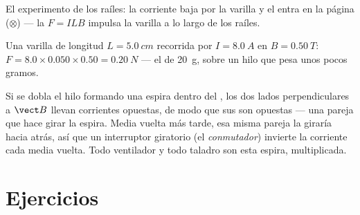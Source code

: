 \begin{omfigure}

{\small El experimento de los raíles: la corriente baja por la varilla y
el  entra en la página ($\otimes$) --- la 
$F = ILB$ impulsa la varilla a lo largo de los raíles.}
\end{omfigure}

\begin{example}\label{ex:g11:magnetic-fields:laplace}
Una varilla de longitud $L = \qty{5.0}{cm}$ recorrida por
$I = \qty{8.0}{A}$ en $B = \qty{0.50}{T}$:
$F = 8.0 \times 0.050 \times 0.50 = \qty{0.20}{N}$ --- el  de
\qty{20}{g}, sobre un hilo que pesa unos pocos gramos.
\end{example}

\begin{remark}\label{rem:g11:magnetic-fields:motor}
Si se dobla el hilo formando una espira dentro del , los dos lados
perpendiculares a $\vect B$ llevan corrientes opuestas, de modo que sus
 son opuestas --- una pareja que hace girar la espira.
Media vuelta más tarde, esa misma pareja la giraría hacia atrás, así que
un interruptor giratorio (el \emph{conmutador})
invierte la corriente cada media vuelta. Todo ventilador y todo
taladro son esta espira, multiplicada.
\end{remark}

\section{Ejercicios}

